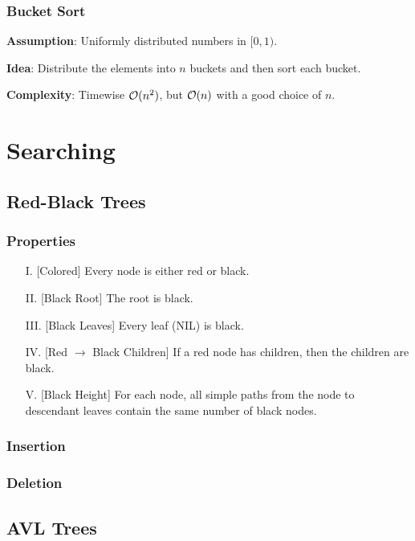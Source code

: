 \documentclass{article}
\begin{document}
\subsubsection{Bucket Sort}
\textbf{Assumption}: Uniformly distributed numbers in $[0,1)$.\par
\textbf{Idea}: Distribute the elements into $n$ buckets and then sort each bucket.\par
\textbf{Complexity}: Timewise $\mathcal{O}(n^2)$, but $\mathcal{O}(n)$ with a good choice of $n$.\par




\section{Searching}
\subsection{Red-Black Trees}
\subsubsection{Properties}
\begin{itemize}
  \item[I.]\label{properties:1} [Colored] Every node is either red or black.
  \item[II.]\label{properties:2} [Black Root] The root is black.
  \item[III.]\label{properties:3} [Black Leaves] Every leaf (NIL) is black.
  \item[IV.]\label{properties:4} [Red $\to$ Black Children] If a red node has children, then the children are black.
  \item[V.]\label{properties:5} [Black Height] For each node, all simple paths from the node to descendant leaves contain the same number of black nodes.
\end{itemize}

\subsubsection{Insertion}


\subsubsection{Deletion}


\subsection{AVL Trees}
\end{document}
